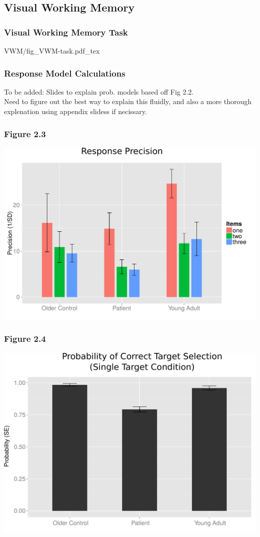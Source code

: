 \documentclass{beamer}
\begin{document}
 \subsection*{Visual Working Memory}

  \begin{frame}
	 \frametitle{Visual Working Memory Task}
  \def\svgwidth{\textwidth}
  {VWM/fig_VWM-task.pdf_tex}
 \end{frame}

 \begin{frame}
	 \frametitle{Response Model Calculations}
 To be added: Slides to explain prob. models based off Fig 2.2.\\
 Need to figure out the best way to explain this fluidly, and also a more thorough
 explenation using appendix slidess if necissary.
 \end{frame}


\end{document}
